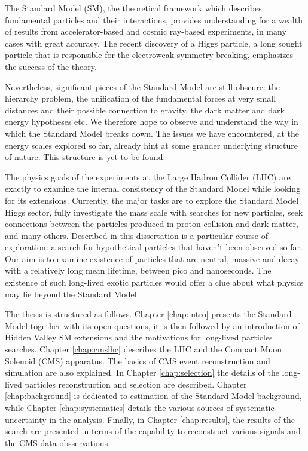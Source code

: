 The Standard Model (SM), the theoretical framework which describes fundamental particles
and their interactions, provides understanding for a wealth of results from accelerator-based
and cosmic ray-based experiments, in many cases with great accuracy.
The recent discovery of a Higgs particle, a long sought particle that is responsible for
the electroweak symmetry 
breaking, emphasizes the success of the theory.

Nevertheless, significant pieces of the Standard Model are still obscure: the hierarchy
problem, the unification of the fundamental forces at very small distances and their possible
connection to gravity, the dark matter and dark energy hypotheses etc. We therefore hope
to observe and understand the way in which the Standard Model breaks down.
The issues we have encountered, at the energy scales explored so far, already
hint at some grander underlying structure of nature. This structure is yet to be found.

The physics goals of the experiments at the Large Hadron Collider (LHC) are exactly to 
examine the internal consistency of the Standard Model while looking for its extensions.
Currently, the major tasks are to explore
the Standard Model Higgs sector, fully investigate the \TeV mass scale with searches
for new particles, seek connections between the particles 
produced in proton collision and dark matter, and many others. 
Described in this dissertation is a particular course of exploration: a search for hypothetical
particles that haven't been observed so far. Our aim is to examine existence of particles
that are neutral, 
massive and decay with a relatively long mean lifetime, between pico and nanoseconds. The existence
of such long-lived exotic
particles would offer a clue about what physics may lie beyond the Standard Model.

The thesis is structured as follows. Chapter \ref{chap:intro}
 presents the Standard Model together with its
open questions, it is then followed by an introduction of Hidden Valley SM extensions and
 the motivations for long-lived particles searches.
Chapter \ref{chap:cmslhc} describes the LHC and the Compact Muon Solenoid (CMS) apparatus.
The basics of CMS event reconstruction and simulation are also explained.
In Chapter \ref{chap:selection}
the details of the long-lived particles reconstruction and selection are described. 
Chapter \ref{chap:background} is dedicated to estimation of the Standard Model
 background, while Chapter
\ref{chap:systematics} details the various sources of systematic uncertainty in the analysis.
Finally, in Chapter \ref{chap:results}, the results of the search are presented in terms
of the capability to reconstruct various signals and the CMS data obsservations.

